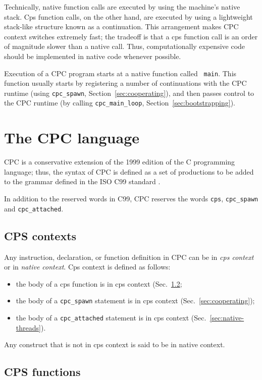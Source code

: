 \documentclass[a4paper]{report}
\begin{document}
Technically, native function calls are executed by using the machine's
native stack.  Cps function calls, on the other hand, are executed by
using a lightweight stack-like structure known as a continuation.
This arrangement makes CPC context switches extremely fast; the
tradeoff is that a cps function call is an order of magnitude slower
than a native call.  Thus, computationally expensive code should be
implemented in native code whenever possible.

Execution of a CPC program starts at a native function called {\tt
  main}.  This function usually starts by registering a number of
continuations with the CPC runtime (using {\tt cpc\_spawn},
Section~\ref{sec:cooperating}), and then passes control to the CPC
runtime (by calling {\tt cpc\_main\_loop}, Section~\ref{sec:bootstrapping}).

\section{The CPC language}

CPC is a conservative extension of the 1999 edition of the C programming
language; thus, the syntax of CPC is defined as a set of productions to be
added to the grammar defined in the ISO C99 standard \cite{iso:c99}.

In addition to the reserved words in C99, CPC reserves the words
{\tt cps}, {\tt cpc\_spawn} and {\tt cpc\_attached}.

\subsection{CPS contexts} \label{sec:contexts}

Any instruction, declaration, or function definition in CPC can be in
{\em cps context\/} or in {\em native context}.  Cps context is
defined as follows:
\begin{itemize}
\item the body of a cps function is in cps context
  (Sec.~\ref{sec:cpc-functions};
\item the body of a {\tt cpc\_spawn} statement is in cps context
  (Sec.~\ref{sec:cooperating});
\item the body of a {\tt cpc\_attached} statement is in cps context
  (Sec.~\ref{sec:native-threads}).
\end{itemize}
Any construct that is not in cps context is said to be in native context.

\subsection{CPS functions} \label{sec:cpc-functions}
\end{document}

